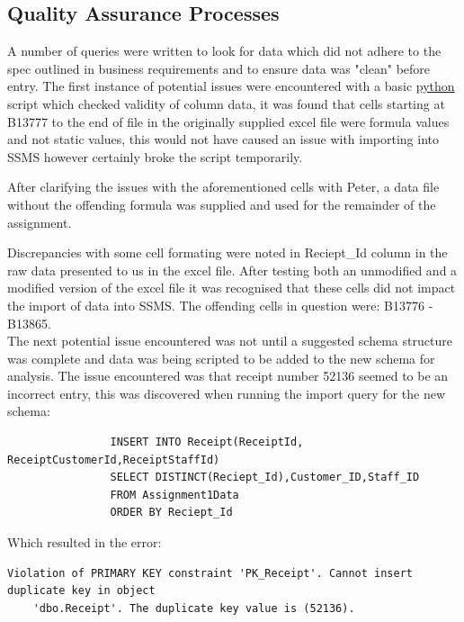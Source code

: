 \documentclass{article}
\begin{document}
        \subsection{Quality Assurance Processes}
        \label{sec:QAP}
            A number of queries were written to look for data which did not adhere to the spec
            outlined in business requirements and to ensure data was "clean" before entry.
            The first instance of potential issues were encountered with a basic \hyperref[sec:Python]{\color{blue}python} script
            which checked validity of column data, it was found that cells starting at B13777
            to the end of file in the originally supplied excel file were formula values and 
            not static values, this would not have caused an issue with importing into SSMS 
            however certainly broke the script temporarily.
            \par
            After clarifying the issues with the aforementioned cells with Peter, a data file without
            the offending formula was supplied and used for the remainder of the assignment.
            \vspace{5mm}
            \par\noindent
            Discrepancies with some cell formating were noted in Reciept\_Id column in the raw
            data presented to us in the excel file. After testing both an unmodified and a modified
            version of the excel file it was recognised that these cells did not impact the import
            of data into SSMS. The offending cells in question were: B13776 - B13865.
            \\
            The next potential issue encountered was not until a suggested schema structure 
            was complete and data was being scripted to be added to the new schema for analysis.
            The issue encountered was that receipt number 52136 seemed to be an incorrect 
            entry, this was discovered when running the import query for the new schema:

            \begin{lstlisting}
                INSERT INTO Receipt(ReceiptId, ReceiptCustomerId,ReceiptStaffId)
                SELECT DISTINCT(Reciept_Id),Customer_ID,Staff_ID
                FROM Assignment1Data
                ORDER BY Reciept_Id
            \end{lstlisting}

            Which resulted in the error:
            \color{red}
            \begin{Verbatim}[fontsize=\small]
    Violation of PRIMARY KEY constraint 'PK_Receipt'. Cannot insert duplicate key in object 
    'dbo.Receipt'. The duplicate key value is (52136).
            \end{Verbatim}
            \color{black}
\end{document}
